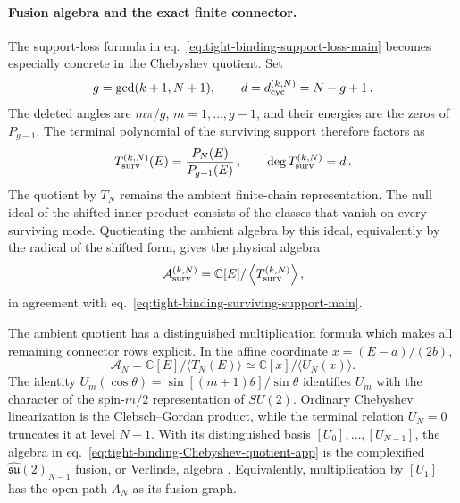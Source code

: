 \documentclass[a4paper,11pt]{article}
\theoremstyle{definition}
\theoremstyle{remark}
\newcommand{\CC}{\mathbb C}
\newcommand{\cA}{\mathcal A}
\begin{document}
\paragraph{Fusion algebra and the exact finite connector.}
The support-loss formula in
eq.~\eqref{eq:tight-binding-support-loss-main} becomes especially
concrete in the Chebyshev quotient.  Set
\begin{equation}
   g=\gcd(k+1,N+1),
   \qquad
   d=d_{\rm cyc}^{(k,N)}=N-g+1\,.
\end{equation}
The deleted angles are $m\pi/g$, $m=1,\ldots,g-1$, and their energies
are the zeros of $P_{g-1}$.  The terminal polynomial of the surviving
support therefore factors as
\begin{equation}
   T_{\rm surv}^{(k,N)}(E)
   =\frac{P_N(E)}{P_{g-1}(E)}\,,
   \qquad
   \deg T_{\rm surv}^{(k,N)}=d\,.
   \label{eq:tight-binding-surviving-factor-app}
\end{equation}
The quotient by $T_N$ remains the ambient finite-chain representation.
The null ideal of the shifted inner product consists of the classes that
vanish on every surviving mode.  Quotienting the ambient algebra by this
ideal, equivalently by the radical of the shifted form, gives the
physical algebra
\begin{equation}
   \cA_{\rm surv}^{(k,N)}
   =\CC[E]/\left\langle T_{\rm surv}^{(k,N)}\right\rangle,
\end{equation}
in agreement with
eq.~\eqref{eq:tight-binding-surviving-support-main}.

The ambient quotient has a distinguished multiplication formula which makes
all remaining connector rows explicit.  In the affine coordinate
$x=(E-a)/(2b)$,
\begin{equation}
   \cA_N
   =\CC[E]/\langle T_N(E)\rangle
   \simeq\CC[x]/\langle U_N(x)\rangle.
   \label{eq:tight-binding-Chebyshev-quotient-app}
\end{equation}
The identity
$U_m(\cos\theta)=\sin[(m+1)\theta]/\sin\theta$
identifies $U_m$ with the character of the spin-$m/2$ representation of
$SU(2)$.  Ordinary Chebyshev linearization is the Clebsch--Gordan
product, while the terminal relation $U_N=0$ truncates it at level
$N-1$.  With its distinguished basis
$[U_0],\ldots,[U_{N-1}]$, the algebra in
eq.~\eqref{eq:tight-binding-Chebyshev-quotient-app} is the complexified
$\widehat{\mathfrak{su}}(2)_{N-1}$ fusion, or Verlinde, algebra
\cite{Verlinde1988}.
Equivalently, multiplication by $[U_1]$ has the open path $A_N$ as its
fusion graph.
\end{document}

